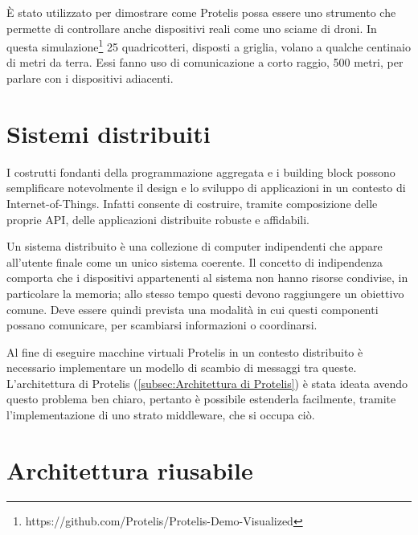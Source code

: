 È stato utilizzato per dimostrare come Protelis possa essere uno strumento che
permette di controllare anche dispositivi reali come uno sciame di droni. In
questa
simulazione\footnote{https://github.com/Protelis/Protelis-Demo-Visualized} 25
quadricotteri, disposti a griglia, volano a qualche centinaio di metri da
terra. Essi fanno uso di comunicazione a corto raggio, 500 metri, per parlare
con i dispositivi adiacenti.

\section{Sistemi distribuiti}
I costrutti fondanti della programmazione aggregata e i building block possono
semplificare notevolmente il design e lo sviluppo di applicazioni in un contesto
di Internet-of-Things\cite{DBLP:journals/computer/BealPV15}. Infatti consente di
costruire, tramite composizione delle proprie API, delle applicazioni
distribuite robuste e affidabili.


Un sistema distribuito è una collezione di computer indipendenti che appare
all'utente finale come un unico sistema coerente\cite{tanenbaum2016}.  Il
concetto di indipendenza comporta che i dispositivi appartenenti al sistema non
hanno risorse condivise, in particolare la memoria; allo stesso tempo questi
devono raggiungere un obiettivo comune. Deve essere quindi prevista una modalità
in cui questi componenti possano comunicare, per scambiarsi informazioni o
coordinarsi.

Al fine di eseguire macchine virtuali Protelis in un contesto distribuito è
necessario implementare un modello di scambio di messaggi tra queste.
L'architettura di Protelis (\ref{subsec:Architettura di Protelis}) è stata ideata avendo questo problema ben chiaro,
pertanto è possibile estenderla facilmente, tramite l'implementazione di uno
strato middleware, che si occupa ciò.


%


\section{Architettura riusabile}

